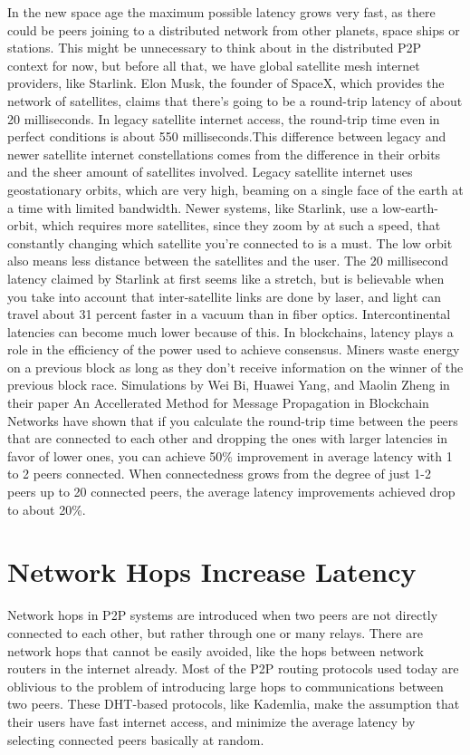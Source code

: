 In the new space age the maximum possible latency grows very fast, as there could be peers joining to a distributed network from other planets, space ships or stations. This might be unnecessary to think about in the distributed P2P context for now, but before all that, we have global satellite mesh internet providers, like Starlink. Elon Musk, the founder of SpaceX, which provides the network of satellites, claims that there's going to be a round-trip latency of about 20 milliseconds.\cite{Tung_undated-ny}  In legacy satellite internet access, the round-trip time even in perfect conditions is about 550 milliseconds.\cite{noauthor_undated-zc}This difference between legacy and newer satellite internet constellations comes from the difference in their orbits and the sheer amount of satellites involved. Legacy satellite internet uses geostationary orbits, which are very high, beaming on a single face of the earth at a time with limited bandwidth. Newer systems, like Starlink, use a low-earth-orbit, which requires more satellites, since they zoom by at such a speed, that constantly changing which satellite you're connected to is a must. The low orbit also means less distance between the satellites and the user. The 20 millisecond latency claimed by Starlink at first seems like a stretch, but is believable when you take into account that inter-satellite links are done by laser, and light can travel about 31 percent faster in a vacuum than in fiber optics.\cite{Finley2013-wt} Intercontinental latencies can become much lower because of this.
In blockchains, latency plays a role in the efficiency of the power used to achieve consensus. Miners waste energy on a previous block as long as they don't receive information on the winner of the previous block race. Simulations by Wei Bi, Huawei Yang, and Maolin Zheng in their paper An Accellerated Method for Message Propagation in Blockchain Networks have shown that if you calculate the round-trip time between the peers that are connected to each other and dropping the ones with larger latencies in favor of lower ones, you can achieve 50\% improvement in average latency with 1 to 2 peers connected. When connectedness grows from the degree of just 1-2 peers up to 20 connected peers, the average latency improvements achieved drop to about 20\%.\cite{Bi_undated-is}

\section{Network Hops Increase Latency}
Network hops in P2P systems are introduced when two peers are not directly connected to each other, but rather through one or many relays. There are network hops that cannot be easily avoided, like the hops between network routers in the internet already. Most of the P2P routing protocols used today are oblivious to the problem of introducing large hops to communications between two peers. These DHT-based protocols, like Kademlia, make the assumption that their users have fast internet access, and minimize the average latency by selecting connected peers basically at random.

